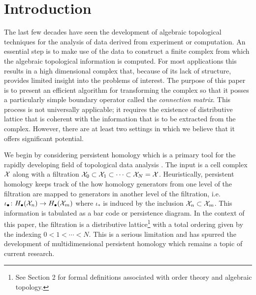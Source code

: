 



\section{Introduction}\label{sec:intro}

The last few decades have seen the development of algebraic topological techniques for the analysis of data derived from experiment or computation.
An essential step is to make use of the data to construct a finite complex from which the algebraic topological information is computed.
For most applications this results in a high dimensional complex that, because of its lack of structure, provides limited insight into the problems of interest.
The purpose of this paper is to present an efficient algorithm for transforming the complex so that it posses a particularly simple boundary operator called the \emph{connection matrix}.
This process is not universally applicable; it requires the existence of distributive lattice that is coherent with the information that is to be extracted from the complex.
However, there are at least two settings in which we believe that it offers significant potential.

We begin by considering persistent homology which is a primary tool for the rapidly developing field of topological data analysis \cite{edelsbruner:harer, oudot, ***}.
The input is a cell complex ${\mathcal X}$ along with a filtration ${\mathcal X}_0 \subset {\mathcal X}_1 \subset \cdots \subset {\mathcal X}_N = {\mathcal X}$.
Heuristically, persistent homology keeps track of the how homology generators from one level of the filtration are mapped to generators in another level of the filtration, i.e.\ $\iota_\bullet \colon H_\bullet({\mathcal X}_n) \to H_\bullet({\mathcal X}_m)$ where $\iota_*$ is induced by the inclusion ${\mathcal X}_n\subset {\mathcal X}_m$.
This information is tabulated as a bar code or persistence diagram.
In the context of this paper, the filtration is a  distributive lattice\footnote{See Section 2 for formal definitions associated with order theory and algebraic topology.}  with a total ordering given by the indexing $0 < 1 < \cdots < N$.
This is a serious limitation and has spurred the development of multidimensional persistent homology \cite{****} which remains a topic of current research.

